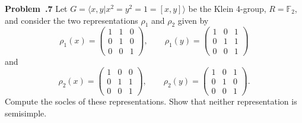 \documentclass[12pt]{article}
\newcommand*{\F}{
\mathbb{F}
}
\newenvironment{prob}[1]{\par\smallskip
	\noindent\begin{mdframed}\small \textbf{Problem~\thesection.#1} \rmfamily\quad}{\end{mdframed}\medskip}
\begin{document}
\begin{prob}{7}
	Let $G=\langle x,y| x^2=y^2=1=[x,y]\rangle$ be the Klein 4-group, $R=\F_2$, and consider the two representations $\rho_1$ and $\rho_2$ given by
	\[\rho_1(x)=\begin{pmatrix}
		1&1&0\\0&1&0\\0&0&1
	\end{pmatrix},\qquad \rho_1(y)=\begin{pmatrix}
	1&0&1\\0&1&1\\0&0&1
	\end{pmatrix}\]
	and
	\[\rho_2(x)=\begin{pmatrix}
	1&0&0\\0&1&1\\0&0&1
	\end{pmatrix},\qquad \rho_2(y)=\begin{pmatrix}
	1&0&1\\0&1&0\\0&0&1
	\end{pmatrix}.\]
	Compute the socles of these representations. Show that neither representation is semisimple.
\end{prob}
\end{document}
